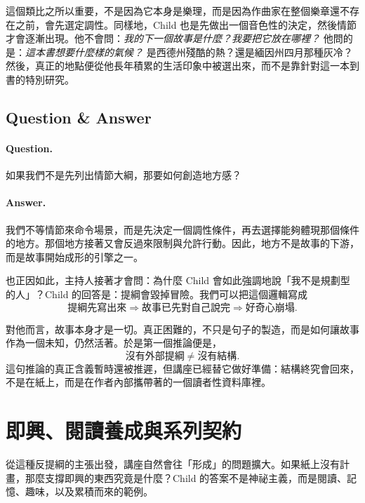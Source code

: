 這個類比之所以重要，不是因為它本身是樂理，而是因為作曲家在整個樂章還不存在之前，會先選定調性。同樣地，Child 也是先做出一個音色性的決定，然後情節才會逐漸出現。他不會問：\emph{我的下一個故事是什麼？我要把它放在哪裡？} 他問的是：\emph{這本書想要什麼樣的氣候？} 是西德州殘酷的熱？還是緬因州四月那種灰冷？然後，真正的地點便從他長年積累的生活印象中被選出來，而不是靠針對這一本到書的特別研究。

\subsection{Question \& Answer}

\paragraph{Question.} 如果我們不是先列出情節大綱，那要如何創造地方感？

\paragraph{Answer.} 我們不等情節來命令場景，而是先決定一個調性條件，再去選擇能夠體現那個條件的地方。那個地方接著又會反過來限制與允許行動。因此，地方不是故事的下游，而是故事開始成形的引擎之一。

也正因如此，主持人接著才會問：為什麼 Child 會如此強調地說「我不是規劃型的人」？Child 的回答是：提綱會毀掉冒險。我們可以把這個邏輯寫成
\begin{equation}
\text{提綱先寫出來} \Longrightarrow \text{故事已先對自己說完} \Longrightarrow \text{好奇心崩塌}.
\end{equation}

對他而言，故事本身才是一切。真正困難的，不只是句子的製造，而是如何讓故事作為一個未知，仍然活著。於是第一個推論便是，
\begin{equation}
\text{沒有外部提綱} \neq \text{沒有結構}.
\end{equation}
這句推論的真正含義暫時還被推遲，但講座已經替它做好準備：結構終究會回來，不是在紙上，而是在作者內部攜帶著的一個讀者性資料庫裡。

\section{即興、閱讀養成與系列契約}

從這種反提綱的主張出發，講座自然會往「形成」的問題擴大。如果紙上沒有計畫，那麼支撐即興的東西究竟是什麼？Child 的答案不是神祕主義，而是閱讀、記憶、趣味，以及累積而來的範例。

